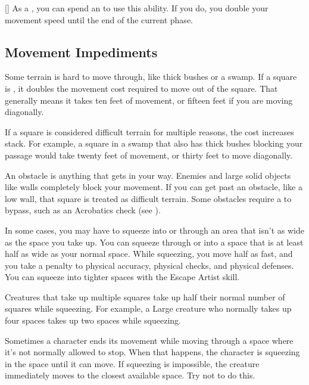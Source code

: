         \begin{ability}{}[]
            As a , you can spend an  to use this ability.
            If you do, you double your movement speed until the end of the current phase.
        \end{ability}

    \subsection{Movement Impediments}

        \label{Difficult Terrain}
        Some terrain is hard to move through, like thick bushes or a swamp.
        If a square is , it doubles the movement cost required to move out of the square.
        That generally means it takes ten feet of movement, or fifteen feet if you are moving diagonally.

        If a square is considered difficult terrain for multiple reasons, the cost increases stack.
        For example, a square in a swamp that also has thick bushes blocking your passage would take twenty feet of movement, or thirty feet to move diagonally.

        An obstacle is anything that gets in your way. Enemies and large solid objects like walls completely block your movement. If you can get past an obstacle, like a low wall, that square is treated as difficult terrain. Some obstacles require a  to bypass, such as an Acrobatics check (see ).

        \label{Squeezing}
        In some cases, you may have to squeeze into or through an area that isn't as wide as the space you take up. You can squeeze through or into a space that is at least half as wide as your normal space. While squeezing, you move half as fast, and you take a  penalty to physical accuracy, physical checks, and physical defenses. You can squeeze into tighter spaces with the Escape Artist skill.

        Creatures that take up multiple squares take up half their normal number of squares while squeezing. For example, a Large creature who normally takes up four spaces takes up two spaces while squeezing.

         Sometimes a character ends its movement while moving through a space where it's not normally allowed to stop. When that happens, the character is squeezing in the space until it can move. If squeezing is impossible, the creature immediately moves to the closest available space. Try not to do this.

